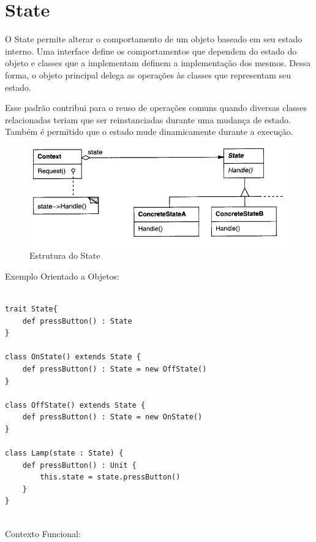 \section{State}

O State permite alterar o comportamento de um objeto baseado 
em seu estado interno. Uma interface define os comportamentos 
que dependem do estado do objeto e classes que a implementam 
definem a implementação dos mesmos. Dessa forma, o objeto 
principal delega as operações às classes que representam 
seu estado.

Esse padrão contribui para o reuso de operações comuns quando 
diversas classes relacionadas teriam que ser reinstanciadas 
durante uma mudança de estado. Também é permitido que o 
estado mude dinamicamente durante a execução.

\begin{figure}[htb]
	\caption{\label{state_struct}Estrutura do State}
	\begin{center}
	    \includegraphics[scale=0.5]{5_padroes-contexto-funcional/5.3_comportamentais/5.3.08_state/diagram.png}
	\end{center}
\end{figure}

Exemplo Orientado a Objetos:

\begin{lstlisting}[caption={State Orientação a Objetos},label=oostate]

trait State{
    def pressButton() : State
}

class OnState() extends State {
    def pressButton() : State = new OffState()
}

class OffState() extends State {
    def pressButton() : State = new OnState()
}

class Lamp(state : State) {
    def pressButton() : Unit {
        this.state = state.pressButton()
    }
}
    
\end{lstlisting}

Contexto Funcional:

